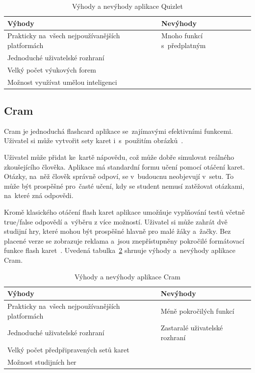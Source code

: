 \documentclass[twoside]{ctuthesis}
\begin{document}
\begin{table}[H]
\caption{Výhody a nevýhody aplikace Quizlet}
\begin{tabular}{| >{\centering\arraybackslash}m{5cm} | >{\centering\arraybackslash}m{5cm} |}
\hline
\textbf{Výhody} & \textbf{Nevýhody} \\ \hline
Prakticky na~všech nejpoužívanějších platformách & Mnoho funkcí s~předplatným \\ \hline
Jednoduché uživatelské rozhraní  & \\ \hline
Velký počet výukových forem  & \\ \hline
Možnost využívat umělou inteligenci  & \\ \hline
\end{tabular}
\label{tab:quiz}
\end{table}

\subsection{Cram}

Cram je jednoduchá flashcard aplikace se~zajímavými efektivními funkcemi. Uživatel si může vytvořit sety karet i~s~použitím obrázků~\cite{ransom}.

Uživatel může přidat ke~kartě nápovědu, což může dobře simulovat reálného zkoušejícího člověka. Aplikace má standardní formu učení pomocí otáčení karet. Otázky, na~něž člověk správně odpoví, se v~budoucnu neobjevují v~setu. To může být prospěšné pro~časté učení, kdy se student nemusí zatěžovat otázkami, na~které zná odpovědi\cite{ransom, cram}.

Kromě klasického otáčení flash karet aplikace umožňuje vyplňování testů včetně true/false odpovědí a~výběru z více možností. Uživatel si může zahrát dvě studijní hry, které mohou být prospěšné hlavně pro malé žáky a~žačky. Bez placené verze se zobrazuje reklama a~jsou znepřístupněny pokročilé formátovací funkce flash karet~\cite{ransom, cram}. Uvedená tabulka~\ref{tab:cr} shrnuje výhody a~nevýhody aplikace Cram.

\newpage

\begin{table}[H]
\caption{Výhody a nevýhody aplikace Cram}
\begin{tabular}{| >{\centering\arraybackslash}m{5cm} | >{\centering\arraybackslash}m{5cm} |}
\hline
\textbf{Výhody} & \textbf{Nevýhody} \\ \hline
Prakticky na~všech nejpoužívanějších platformách & Méně pokročilých funkcí \\ \hline
Jednoduché uživatelské rozhraní  & Zastaralé uživatelské rozhraní \\ \hline
Velký počet předpřipravených setů karet  & \\ \hline
Možnost studijních her & \\ \hline
\end{tabular}
\label{tab:cr}
\end{table}
\end{document}
